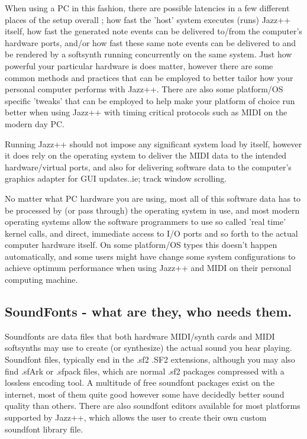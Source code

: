 \documentclass[letterpaper]{report}
\begin{document}
When using a PC in this fashion, there are possible latencies in a few different
places of the setup overall ; how fast the 'host' system executes (runs) Jazz++
itself, how fast the generated note events can be delivered to/from the
computer's hardware ports, and/or how fast these same note events can be
delivered to and be rendered by a softsynth running concurrently on the same
system. Just how powerful your particular hardware is does matter, however there
are some common methods and practices that can be employed to better tailor how
your personal computer performs with Jazz++. There are also some platform/OS
specific 'tweaks' that can be employed to help make your platform of choice run
better when using Jazz++ with timing critical protocols such as MIDI on the
modern day PC.

Running Jazz++ should not impose any significant system load by itself, however
it does rely on the operating system to deliver the MIDI data to the intended
hardware/virtual ports, and also for delivering software data to the computer's
graphics adapter for GUI updates..ie; track window scrolling.

No matter what PC hardware you are using, most all of this software data has to
be processed by (or pass through) the operating system in use, and most modern
operating systems allow the software programmers to use so called 'real time'
kernel calls, and direct, immediate access to I/O ports and so forth to the
actual computer hardware itself. On some platform/OS types this doesn't happen
automatically, and some users might have change some system configurations to
achieve optimum performance when using Jazz++ and MIDI on their personal
computing machine.

\subsection{SoundFonts - what are they, who needs them.}

Soundfonts are data files that both hardware MIDI/synth cards and MIDI
softsynths may use to create (or synthesize) the actual sound you hear playing.
Soundfont files, typically end in the .sf2 .SF2 extensions, although you may
also find .sfArk or .sfpack files, which are normal .sf2 packages compressed
with a lossless encoding tool. A multitude of free soundfont packages exist on
the internet, most of them quite good however some have decidedly better sound
quality than others. There are also soundfont editors available for most
platforms supported by Jazz++, which allows the user to create their own custom
soundfont library file.
\end{document}
